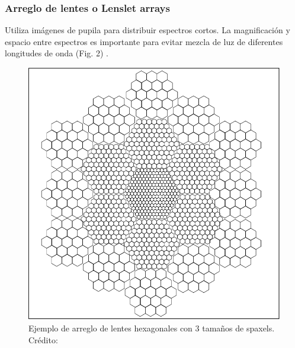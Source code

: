 \documentclass[10pt,twocolumn,a4paper]{opticajnl}
\begin{document}
\subsubsection*{Arreglo de lentes o Lenslet arrays}
Utiliza imágenes de pupila para distribuir espectros cortos. La magnificación y espacio entre espectros es importante para evitar mezcla de luz de diferentes longitudes de onda (Fig. 2) \cite{allington2006basic}.
\begin{figure}
    \centering
    \includegraphics[width=0.8\linewidth]{lensletsimg1.png}
    \caption{Ejemplo de arreglo de lentes hexagonales con 3 tamaños de spaxels. Crédito: \cite{schmoll2006design}}
    \label{fig:lensletsimg1}
\end{figure}
\end{document}
